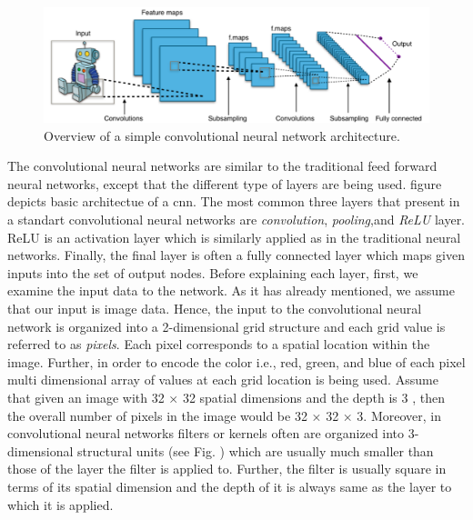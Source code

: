 \begin{figure}[h]
\centering
 \includegraphics[width=\linewidth]{Figures/fig_cnn.png}
 \caption{Overview of a simple convolutional neural network architecture.}
 \label{fig:cnn}
\end{figure}

The convolutional neural networks are similar to the traditional feed forward neural networks, except that the different type of layers are being used. figure depicts basic architectue of a cnn. The most common three layers that present in a standart convolutional neural networks are \textit{convolution}, \textit{pooling},and \textit{ReLU} layer. ReLU is an activation layer which is similarly applied as in the traditional neural networks. Finally, the final layer is often a fully connected layer which maps given inputs into the set of output nodes. Before explaining each layer, first, we examine the input data to the network. As it has already mentioned, we assume that our input is image data. Hence, the input to the convolutional neural network is organized into a 2-dimensional grid structure and each grid value is referred to as \textit{pixels}. Each pixel corresponds to a spatial location within the image. Further, in order to encode the color i.e., red, green, and blue of each pixel multi dimensional array of values at each grid location is being used. Assume that given an image with 32 × 32 spatial dimensions and the depth is 3 , then the overall number of pixels in the image would be 32 × 32 × 3. Moreover, in convolutional neural networks filters or kernels often are organized into 3-dimensional structural units (see Fig. ) which are usually much smaller than those of the layer the filter is applied to. Further, the filter is usually square in terms of its spatial dimension and the depth of it is always same as the layer to which it is applied. 

